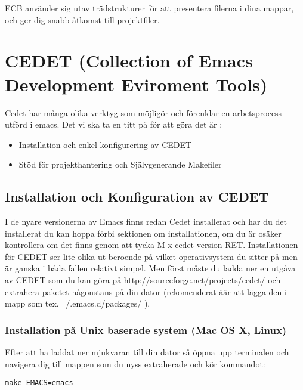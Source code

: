 \documentclass[12pt]{article} %
\begin{document}
ECB använder sig utav trädstrukturer för att presentera filerna i dina mappar, och ger dig snabb åtkomst till projektfiler.





\newpage
\section{CEDET (Collection of Emacs Development Eviroment Tools)} %

Cedet har många olika verktyg som möjligör och förenklar en arbetsprocess utförd i emacs. Det vi ska ta en titt på för att göra det är :
\begin{itemize}
\item Installation och enkel konfigurering av CEDET
\item Stöd för projekthantering och Självgenerande Makefiler
\end{itemize}


\subsection{Installation och Konfiguration av CEDET} %
I de nyare versionerna av Emacs finns redan Cedet installerat och har du det installerat du kan hoppa förbi sektionen om installationen, om du är osäker kontrollera om det finns genom att tycka M-x cedet-version RET. 
Installationen för CEDET ser lite olika ut beroende på vilket operativsystem du sitter på men är ganska i båda fallen relativt simpel. Men först måste du ladda ner en utgåva av CEDET som du kan göra på
{http://sourceforge.net/projects/cedet/} och extrahera paketet någonstans på din dator (rekomenderat äär att lägga den i mapp som tex.  ~/.emacs.d/packages/ ).

\subsubsection{Installation på Unix baserade system (Mac OS X, Linux)}
Efter att ha laddat ner mjukvaran till din dator så öppna upp terminalen och navigera dig till mappen som du nyss extraherade och kör kommandot:
\begin{lstlisting}
make EMACS=emacs
\end{lstlisting}
\end{document}
